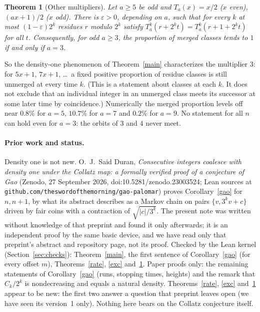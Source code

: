 \documentclass[11pt]{article}
\newtheorem{theorem}{Theorem}
\theoremstyle{remark}
\begin{document}
\begin{theorem}[Other multipliers]\label{five}
Let $a\ge5$ be odd and $T_a(x)=x/2$ ($x$ even), $(ax+1)/2$ ($x$ odd). There is $\varepsilon>0$,
depending on $a$, such that for every $k$ at most $(1-\varepsilon)2^k$ residues $r$ modulo $2^k$
satisfy $T_a^k(r+2^kt)=T_a^k(r+1+2^kt)$ for all $t$. Consequently, for odd $a\ge3$, the proportion
of merged classes tends to $1$ if and only if $a=3$.
\end{theorem}
So the density-one phenomenon of Theorem~\ref{main} characterizes the multiplier $3$: for $5x+1$,
$7x+1$, \dots\ a fixed positive proportion of residue classes is still unmerged at every time $k$.
(This is a statement about classes at each $k$. It does not exclude that an individual integer in
an unmerged class meets its successor at some later time by coincidence.) Numerically the merged proportion
levels off near $0.8\%$ for $a=5$, $10.7\%$ for $a=7$ and $0.2\%$ for $a=9$. No statement for all
$n$ can hold even for $a=3$: the orbits of $3$ and $4$ never meet.

\paragraph{Prior work and status.} Density one is not new. O.~J.~Said Duran, \emph{Consecutive integers
coalesce with density one under the Collatz map: a formally verified proof of a conjecture of Gao}
(Zenodo, 27 September 2026, doi:10.5281/zenodo.23003524; Lean sources at
\texttt{github.com/theswordofthemorning/gao-palomar}) proves Corollary~\ref{gao} for $n,n+1$, by
what its abstract describes as a Markov chain on pairs $\{v,3^kv+c\}$ driven by fair coins with a
contraction of $\sqrt{|c|/3^k}$. The present note was written without knowledge of that preprint
and found it only afterwards; it is an independent proof by the same basic device, and we have
read only that preprint's abstract and repository page, not its proof. Checked by the Lean kernel
(Section~\ref{sec:checks}): Theorem~\ref{main}, the first sentence of Corollary~\ref{gao} (for
every offset $m$), Theorems~\ref{rate}, \ref{exc} and~\ref{five}. Paper proofs only: the remaining
statements of Corollary~\ref{gao} (runs, stopping times, heights) and the remark that $C_k/2^k$
is nondecreasing and equals a natural density. Theorems~\ref{rate}, \ref{exc} and~\ref{five} appear to be
new: the first two answer a question that preprint leaves open (we have seen its version~1 only). Nothing here bears on the Collatz conjecture itself.
\end{document}
